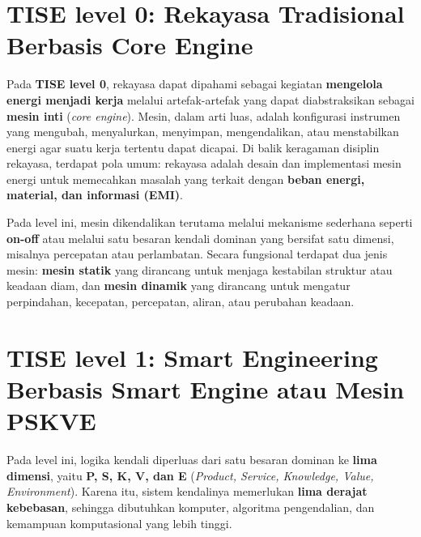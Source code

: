 \documentclass[
  letterpaper,
  DIV=11,
  numbers=noendperiod]{scrreprt}
\begin{document}

\section*{TISE level 0: Rekayasa Tradisional Berbasis Core
Engine}\label{tise-level-0-rekayasa-tradisional-berbasis-core-engine}


Pada \textbf{TISE level 0}, rekayasa dapat dipahami sebagai kegiatan
\textbf{mengelola energi menjadi kerja} melalui artefak-artefak yang
dapat diabstraksikan sebagai \textbf{mesin inti} (\emph{core engine}).
Mesin, dalam arti luas, adalah konfigurasi instrumen yang mengubah,
menyalurkan, menyimpan, mengendalikan, atau menstabilkan energi agar
suatu kerja tertentu dapat dicapai. Di balik keragaman disiplin
rekayasa, terdapat pola umum: rekayasa adalah desain dan implementasi
mesin energi untuk memecahkan masalah yang terkait dengan \textbf{beban
energi, material, dan informasi (EMI)}.

Pada level ini, mesin dikendalikan terutama melalui mekanisme sederhana
seperti \textbf{on-off} atau melalui satu besaran kendali dominan yang
bersifat satu dimensi, misalnya percepatan atau perlambatan. Secara
fungsional terdapat dua jenis mesin: \textbf{mesin statik} yang
dirancang untuk menjaga kestabilan struktur atau keadaan diam, dan
\textbf{mesin dinamik} yang dirancang untuk mengatur perpindahan,
kecepatan, percepatan, aliran, atau perubahan keadaan.

\section*{TISE level 1: Smart Engineering Berbasis Smart Engine atau
Mesin
PSKVE}\label{tise-level-1-smart-engineering-berbasis-smart-engine-atau-mesin-pskve}


Pada level ini, logika kendali diperluas dari satu besaran dominan ke
\textbf{lima dimensi}, yaitu \textbf{P, S, K, V, dan E} (\emph{Product,
Service, Knowledge, Value, Environment}). Karena itu, sistem kendalinya
memerlukan \textbf{lima derajat kebebasan}, sehingga dibutuhkan
komputer, algoritma pengendalian, dan kemampuan komputasional yang lebih
tinggi.
\end{document}
